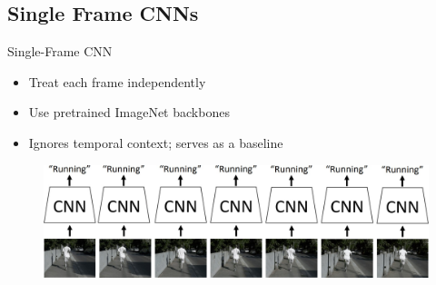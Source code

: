 \subsection{Single Frame CNNs}

\begin{frame}[allowframebreaks]{Single-Frame CNN}
    \begin{itemize}
        \item Treat each frame independently
        \item Use pretrained ImageNet backbones
        \item Ignores temporal context; serves as a baseline
    \end{itemize}
\framebreak
    \begin{figure}
        \centering
        \includegraphics[width=1\textwidth,height=0.9\textheight,keepaspectratio]{images/video/slide_9_1_img.jpg}
    \end{figure}
\end{frame}